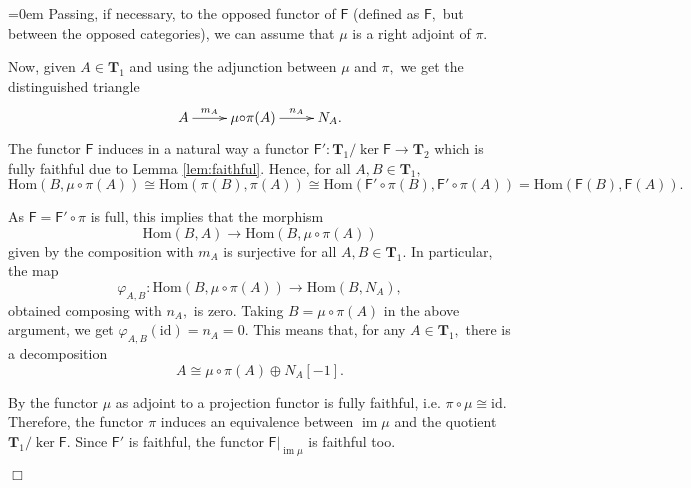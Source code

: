 \documentclass[a4paper,11pt,twoside]{amsart}
\numberwithin{equation}{section}
\theoremstyle{definition}
\renewenvironment{proof}{\par\vspace{-5pt}\par\noindent\begingroup\leftskip=0em\hspace{0em}{\bf Proof.}}{\endgroup\hfill$\Box$}
\begin{document}
\begin{proof}
Passing, if necessary, to the opposed functor of ${\mathsf{{F}}}$ (defined as ${\mathsf{{F}}},$ but between the opposed categories), we can assume that $\mu$ is a right adjoint of $\pi.$

Now, given $A\in{{\mathbf{{T}}}}_1$ and using the adjunction between $\mu$ and $\pi,$ we get the distinguished triangle
\begin{equation*}\label{eqn:1}
\xymatrix{
A\ar[r]^-{m_A}& \mu{\circ}\pi(A)\ar[r]^-{n_A}& N_A.
}
\end{equation*}
The functor ${\mathsf{{F}}}$ induces in a natural way a functor ${\mathsf{{F}}}'\colon{{\mathbf{{T}}}}_1/\ker{\mathsf{{F}}}\to{{\mathbf{{T}}}}_2$ which is fully faithful due to Lemma \ref{lem:faithful}. Hence, for all $A,B\in{{\mathbf{{T}}}}_1,$
\[
{\mathrm{Hom}}(B,\mu{\circ}\pi(A)){\cong}{\mathrm{Hom}}(\pi(B),\pi(A)){\cong}{\mathrm{Hom}}({\mathsf{{F}}}'{\circ}\pi(B),{\mathsf{{F}}}'{\circ}\pi(A))={\mathrm{Hom}}({\mathsf{{F}}}(B),{\mathsf{{F}}}(A)).
\]

As ${\mathsf{{F}}}={\mathsf{{F}}}'{\circ}\pi$ is full, this implies that the morphism
\[
{\mathrm{Hom}}(B,A)\longrightarrow{\mathrm{Hom}}(B,\mu{\circ}\pi(A))
\]
given by the composition with $m_A$ is surjective for all $A,B\in{{\mathbf{{T}}}}_1.$ In particular, the map
\[
\varphi_{A,B}\colon{\mathrm{Hom}}(B,\mu{\circ}\pi(A))\longrightarrow{\mathrm{Hom}}(B,N_A),
\]
obtained composing with $n_A,$ is zero. Taking $B=\mu{\circ}\pi(A)$ in the above argument, we get $\varphi_{A,B}({\mathrm{id}})=n_A=0.$ This means that, for any $A\in{{\mathbf{{T}}}}_1,$ there is a decomposition
\[
A{\cong}\mu{\circ}\pi(A)\oplus{{N_A}[-1]}.
\]

By \cite[Lemma 9.1.7]{N2} the functor $\mu$ as adjoint to a projection functor is fully faithful, i.e. $\pi\circ\mu\cong {\mathrm{id}}.$
Therefore, the functor $\pi$ induces an equivalence between $\operatorname{im}\mu$ and  the quotient ${{\mathbf{{T}}}}_1/\ker{\mathsf{{F}}}.$
Since ${\mathsf{{F}}}'$ is faithful, the functor ${\mathsf{{F}}}{|_{{\operatorname{im}\mu}}}$ is faithful too.


\end{proof}
\end{document}
